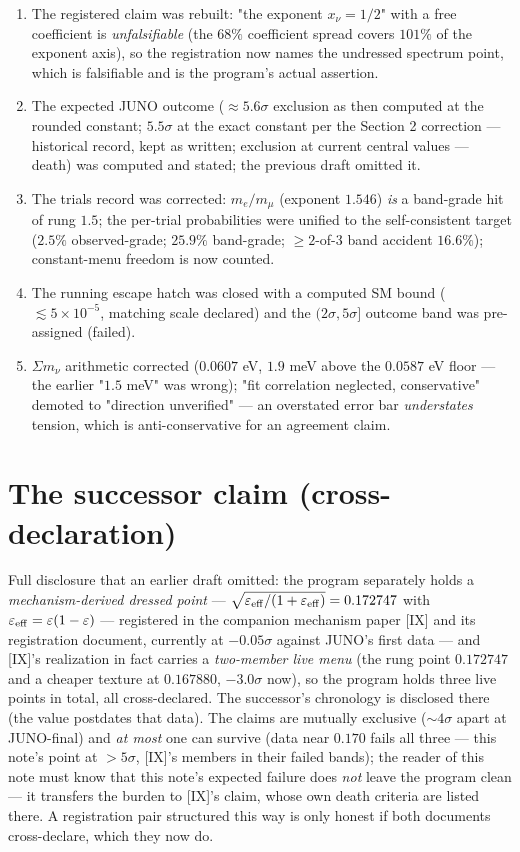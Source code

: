 \documentclass[11pt]{article}
\begin{document}
\begin{enumerate}
\item The registered claim was rebuilt: "the exponent $x_\nu = 1/2$" with a free coefficient is \emph{unfalsifiable} (the $68\%$ coefficient spread covers $101\%$ of the exponent axis), so the registration now names the undressed spectrum point, which is falsifiable and is the program's actual assertion.
\item The expected JUNO outcome ($\approx 5.6\sigma$ exclusion as then computed at the rounded constant; $5.5\sigma$ at the exact constant per the Section 2 correction — historical record, kept as written; exclusion at current central values — death) was computed and stated; the previous draft omitted it.
\item The trials record was corrected: $m_e/m_\mu$ (exponent $1.546$) \emph{is} a band-grade hit of rung $1.5$; the per-trial probabilities were unified to the self-consistent target ($2.5\%$ observed-grade; $25.9\%$ band-grade; $\ge 2$-of-$3$ band accident $16.6\%$); constant-menu freedom is now counted.
\item The running escape hatch was closed with a computed SM bound ($\lesssim 5\times 10^{-5}$, matching scale declared) and the $(2\sigma, 5\sigma]$ outcome band was pre-assigned (failed).
\item $\Sigma m_\nu$ arithmetic corrected ($0.0607$ eV, $1.9$ meV above the $0.0587$ eV floor — the earlier "$1.5$ meV" was wrong); "fit correlation neglected, conservative" demoted to "direction unverified" — an overstated error bar \emph{understates} tension, which is anti-conservative for an agreement claim.
\end{enumerate}
\section*{The successor claim (cross-declaration)}
Full disclosure that an earlier draft omitted: the program separately holds a \emph{mechanism-derived dressed point} — $\sqrt{\varepsilon_{\rm eff}/(1+\varepsilon_{\rm eff})} = 0.172747$ with $\varepsilon_{\rm eff} = \varepsilon(1- \varepsilon)$ — registered in the companion mechanism paper [IX] and its registration document, currently at $-0.05\sigma$ against JUNO's first data — and [IX]'s realization in fact carries a \emph{two-member live menu} (the rung point $0.172747$ and a cheaper texture at $0.167880$, $-3.0\sigma$ now), so the program holds three live points in total, all cross-declared.  The successor's chronology is disclosed there (the value postdates that data).  The claims are mutually exclusive ($\sim 4\sigma$ apart at JUNO-final) and \emph{at most} one can survive (data near $0.170$ fails all three — this note's point at $> 5\sigma$, [IX]'s members in their failed bands); the reader of this note must know that this note's expected failure does \emph{not} leave the program clean — it transfers the burden to [IX]'s claim, whose own death criteria are listed there. A registration pair structured this way is only honest if both documents cross-declare, which they now do.
\end{document}
